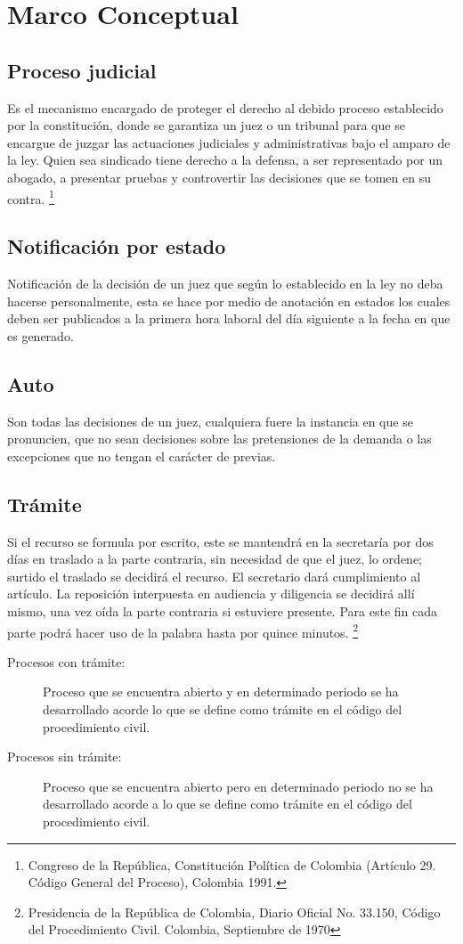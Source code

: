 \section{Marco Conceptual}
\subsection{Proceso judicial}
Es el mecanismo encargado de proteger el derecho al debido proceso 
establecido por la constituci\'on, donde se garantiza un juez o un 
tribunal para que se encargue de juzgar las actuaciones judiciales y 
administrativas bajo el amparo de la ley. Quien sea sindicado tiene 
derecho a la defensa, a ser representado por un abogado, a presentar 
pruebas y controvertir las decisiones que se tomen en su contra.
\footnote{Congreso de la Rep\'ublica, Constituci\'on Pol\'itica de Colombia (Art\'iculo 29. C\'odigo General del Proceso), Colombia 1991.}


\subsection{Notificaci\'on por estado} 
Notificaci\'on de la decisi\'on de un juez que seg\'un lo establecido en la 
ley no deba hacerse personalmente, esta se hace por medio de anotaci\'on 
en estados los cuales deben ser publicados a la primera hora laboral 
del d\'ia siguiente a la fecha en que es generado.

\subsection{Auto}
Son todas las decisiones de un juez, cualquiera fuere la instancia en 
que se pronuncien, que no sean decisiones sobre las pretensiones de
la demanda o las excepciones que no tengan el car\'acter de previas.

\subsection{Tr\'amite} Si el recurso se formula por escrito, este se mantendr\'a en la secretar\'ia por dos d\'ias en traslado a la parte contraria, sin necesidad de que el juez, lo ordene; surtido el traslado se decidir\'a el recurso. El secretario dar\'a cumplimiento al art\'iculo.
La reposici\'on interpuesta en audiencia y diligencia se decidir\'a all\'i mismo, una vez o\'ida la parte contraria si estuviere presente. Para este fin cada parte podr\'a hacer uso de la palabra hasta por quince minutos. \footnote{Presidencia de la Rep\'ublica de Colombia, Diario Oficial No. 33.150, C\'odigo del Procedimiento Civil.  Colombia, Septiembre de 1970}
\begin{description}
\item[Procesos con tr\'amite:] Proceso que se encuentra abierto y en 
determinado periodo se ha desarrollado acorde lo que  se define como 
tr\'amite en el c\'odigo del procedimiento civil.

\item[Procesos sin tr\'amite:] Proceso que se encuentra abierto pero en 
determinado periodo no se ha desarrollado acorde a lo que se define 
como tr\'amite en el c\'odigo del procedimiento civil.
\end{description}

